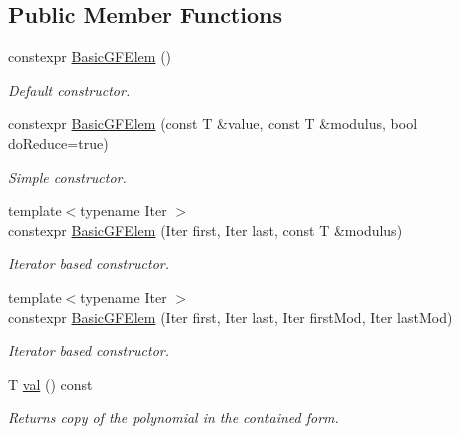 \subsection*{Public Member Functions}
\begin{DoxyCompactItemize}
\item 
\mbox{\label{class_g_flinalg_1_1_basic_g_f_elem_a517bb1c04b5abe1b8e64d8b34371dd4c}} 
constexpr \mbox{\hyperlink{class_g_flinalg_1_1_basic_g_f_elem_a517bb1c04b5abe1b8e64d8b34371dd4c}{Basic\+G\+F\+Elem}} ()
\begin{DoxyCompactList}\small\item\em Default constructor. \end{DoxyCompactList}\item 
constexpr \mbox{\hyperlink{class_g_flinalg_1_1_basic_g_f_elem_aae794a7c05d6cb24c3bfe13f92a14548}{Basic\+G\+F\+Elem}} (const T \&value, const T \&modulus, bool do\+Reduce=true)
\begin{DoxyCompactList}\small\item\em Simple constructor. \end{DoxyCompactList}\item 
{\footnotesize template$<$typename Iter $>$ }\\constexpr \mbox{\hyperlink{class_g_flinalg_1_1_basic_g_f_elem_ac4ac0fdec07cf35dc481b24fd9b79f64}{Basic\+G\+F\+Elem}} (Iter first, Iter last, const T \&modulus)
\begin{DoxyCompactList}\small\item\em Iterator based constructor. \end{DoxyCompactList}\item 
{\footnotesize template$<$typename Iter $>$ }\\constexpr \mbox{\hyperlink{class_g_flinalg_1_1_basic_g_f_elem_a0e1cc31b217d4afa3b3f828e28b5fbc3}{Basic\+G\+F\+Elem}} (Iter first, Iter last, Iter first\+Mod, Iter last\+Mod)
\begin{DoxyCompactList}\small\item\em Iterator based constructor. \end{DoxyCompactList}\item 
\mbox{\label{class_g_flinalg_1_1_basic_g_f_elem_ab8acf4373ba8172d801228d16efcc1d0}} 
T \mbox{\hyperlink{class_g_flinalg_1_1_basic_g_f_elem_ab8acf4373ba8172d801228d16efcc1d0}{val}} () const
\begin{DoxyCompactList}\small\item\em Returns copy of the polynomial in the contained form. \end{DoxyCompactList}\item 

\end{DoxyCompactItemize}
